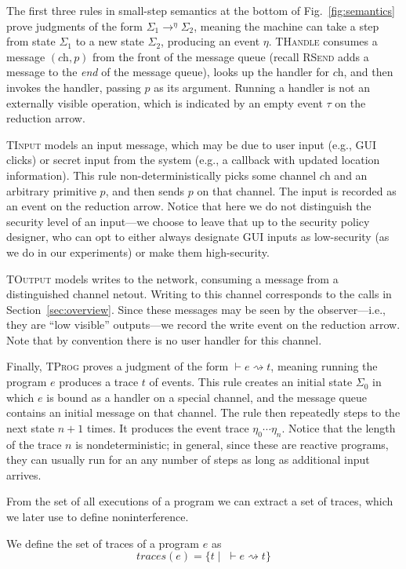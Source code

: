 \documentclass{entcs} \usepackage{entcsmacro}
\newcommand{\code}[1]{\text{\lstinline!#1!}}
\newcommand{\aset}[1]{\{#1\}}
\newcommand{\sfmt}[1]{\textsf{#1}}
\newcommand{\sch}{\textit{ch}}
\newcommand{\treduce}{\rightarrow}
\newcommand{\judge}{\vdash}
\newcommand{\xv}{p}
\newcommand{\traces}{\textit{traces}}
\newcommand{\evt}{\eta}
\begin{document}
The first three rules 
in small-step semantics at the bottom of
Fig.~\ref{fig:semantics} prove judgments of the form
$\Sigma_1 \treduce^{\evt} \Sigma_2$, meaning the machine can take a step from state
$\Sigma_1$ to a new state $\Sigma_2$, producing an event $\evt$.
\textsc{THandle} consumes a message $(\sch, \xv)$ from the front of
the message queue (recall \textsc{RSend} adds a message to the
\emph{end}  of the message queue), looks up the handler for $\sch$,
and then invokes the handler, passing $\xv$ as its argument. Running a
handler is not an externally visible operation, which is indicated by an empty
event $\tau$ on the reduction arrow. 

\textsc{TInput} models an input message, which may be due to user
input (e.g., GUI clicks) or secret input from the system (e.g.,
a callback with updated location information). This rule
non-deterministically picks some channel $\sch$ and an arbitrary
primitive $p$, and then sends $p$ on that channel. 
The input is recorded as an event on the reduction arrow.
Notice that here we do not distinguish the security level of an input---we choose to leave that
up to the security policy designer, who can opt to either always
designate GUI inputs as low-security (as we do in our experiments) or
make them high-security.

\textsc{TOutput} models writes to the network, consuming a message
from a distinguished channel \sfmt{netout}. Writing to this channel
corresponds to the \code{InfoSender.sendInt} calls in
Section~\ref{sec:overview}. Since these messages may be seen by the
observer---i.e., they are ``low visible'' outputs---we record the
write event on the reduction arrow. Note that by convention
there is no user handler for this channel.

Finally, \textsc{TProg} proves a judgment of the form
$\judge e \rightsquigarrow t$, meaning running the program $e$ produces a
trace $t$ of events.
This rule creates an initial state $\Sigma_0$ in
which $e$ is bound as a handler on a special \code{onCreate} channel,
and the message queue contains an initial message on that channel. The
rule then repeatedly steps to the next state $n+1$ times. It produces 
the event trace $\eta_0\cdots\eta_n$.
Notice that the length of the trace $n$ is nondeterministic; in general,
since these are reactive programs, they can usually run for an any
number of steps as long as additional input arrives.

From the set of all executions of a program we can extract a set of
traces, which we later use to define noninterference.
\begin{definition}
  We define the set of traces of a program $e$ as
\begin{displaymath}
   \traces(e) = \aset{t \mid \; \judge e { \rightsquigarrow t }}
\end{displaymath}
\end{definition}
\end{document}
